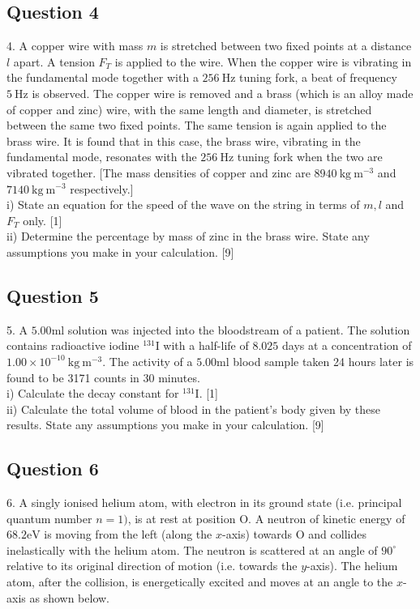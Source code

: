 \documentclass{article}
\begin{document}
\subsection{Question 4}
4. A copper wire with mass $m$ is stretched between two fixed points at a distance $l$ apart. A tension $F_{T}$ is applied to the wire. When the copper wire is vibrating in the fundamental mode together with a $256 \mathrm{~Hz}$ tuning fork, a beat of frequency $5 \mathrm{~Hz}$ is observed. The copper wire is removed and a brass (which is an alloy made of copper and zinc) wire, with the same length and diameter, is stretched between the same two fixed points. The same tension is again applied to the brass wire. It is found that in this case, the brass wire, vibrating in the fundamental mode, resonates with the $256 \mathrm{~Hz}$ tuning fork when the two are vibrated together. [The mass densities of copper and zinc are $8940 \mathrm{~kg} \mathrm{~m}^{-3}$ and $7140 \mathrm{~kg} \mathrm{~m}^{-3}$ respectively.] \\
i) State an equation for the speed of the wave on the string in terms of $m, l$ and $F_{T}$ only. [1] \\
ii) Determine the percentage by mass of zinc in the brass wire. State any assumptions you make in your calculation. [9] 

\subsection{Question 5}
5. A $5.00 \mathrm{ml}$ solution was injected into the bloodstream of a patient. The solution contains radioactive iodine ${ }^{131} \mathrm{I}$ with a half-life of $8.025$ days at a concentration of $1.00 \times 10^{-10} \mathrm{~kg} \mathrm{~m}^{-3}$. The activity of a $5.00 \mathrm{ml}$ blood sample taken 24 hours later is found to be 3171 counts in 30 minutes. \\
i) Calculate the decay constant for ${ }^{131} \mathrm{I}$. [1]\\
ii) Calculate the total volume of blood in the patient's body given by these results. State any assumptions you make in your calculation. [9]

\subsection{Question 6}
6. A singly ionised helium atom, with electron in its ground state (i.e. principal quantum number $n=1)$, is at rest at position $\mathrm{O}$. A neutron of kinetic energy of $68.2 \mathrm{eV}$ is moving from the left (along the $x$-axis) towards $\mathrm{O}$ and collides inelastically with the helium atom. The neutron is scattered at an angle of $90^{\circ}$ relative to its original direction of motion (i.e. towards the $y$-axis). The helium atom, after the collision, is energetically excited and moves at an angle to the $x$-axis as shown below.
\end{document}
